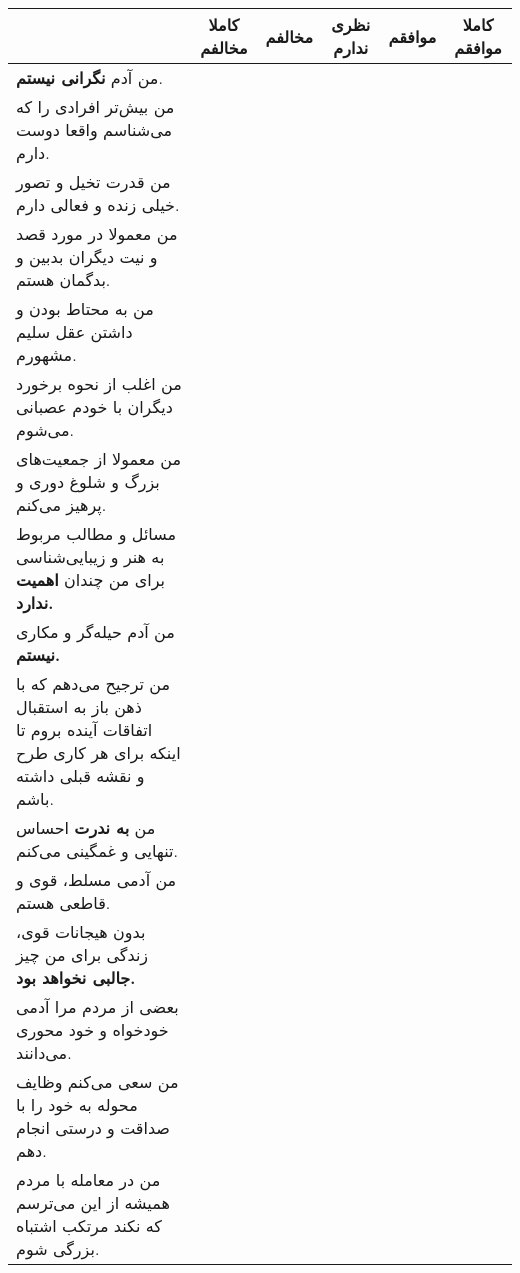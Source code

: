 \documentclass[a4paper,10pt]{article}
\begin{document}
\begin{center}
\begin{tabular}{|p{6cm}|c|c|c|c|c|}
\hline
 & کاملا مخالفم & مخالفم & نظری ندارم & موافقم & کاملا موافقم\\
\hline
من آدم \textbf{نگرانی نیستم}. &  &  &  &  & \\
\hline

من بیش‌تر افرادی را که می‌شناسم واقعا دوست دارم.& & & & & \\
\hline

من قدرت تخیل و تصور خیلی زنده و فعالی دارم.& & & & & \\
\hline

من معمولا در مورد قصد و نیت دیگران بدبین و بدگمان هستم.& & & & & \\
\hline

من به محتاط بودن و داشتن عقل سلیم مشهورم.& & & & & \\
\hline

من اغلب از نحوه برخورد دیگران با خودم عصبانی می‌شوم.& & & & & \\
\hline

من معمولا از جمعیت‌های بزرگ و شلوغ دوری و پرهیز می‌کنم.& & & & & \\
\hline

مسائل و مطالب مربوط به هنر و زیبایی‌شناسی برای من چندان \textbf{اهمیت ندارد.}& & & & & \\
\hline

من آدم حیله‌گر و مکاری \textbf{نیستم.}& & & & & \\
\hline

من ترجیح می‌دهم که با ذهن باز به استقبال اتفاقات آینده بروم تا اینکه برای هر کاری طرح و نقشه قبلی داشته باشم.& & & & & \\
\hline

من \textbf{به ندرت} احساس تنهایی و غمگینی می‌کنم.& & & & & \\
\hline

من آدمی مسلط، قوی و قاطعی هستم.& & & & & \\
\hline

بدون هیجانات قوی، زندگی برای من چیز \textbf{جالبی نخواهد بود.}& & & & & \\
\hline

بعضی از مردم مرا آدمی خودخواه و خود محوری می‌دانند.& & & & & \\
\hline

من سعی می‌کنم وظایف محوله به خود را با صداقت و درستی انجام دهم.& & & & & \\
\hline

من در معامله با مردم همیشه از این می‌ترسم که نکند مرتکب اشتباه بزرگی شوم.& & & & & \\
\hline


\end{tabular}
\end{center}
\end{document}
